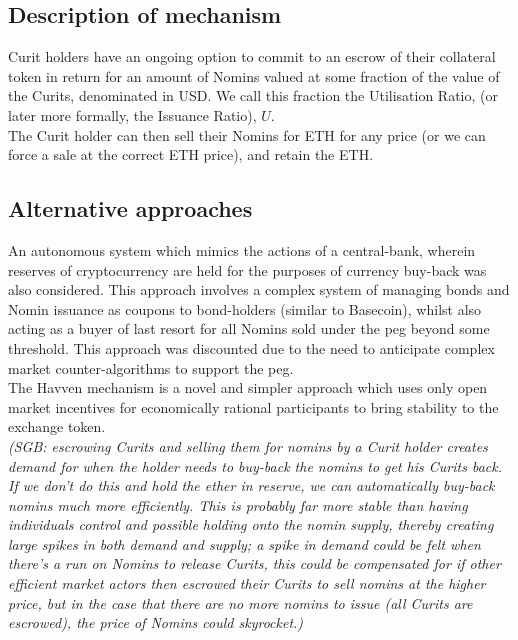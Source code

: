 \subsection{Description of mechanism}

Curit holders have an ongoing option to commit to an escrow of their collateral token in return for an amount of Nomins valued at some fraction of the value of the Curits, denominated in USD. We call this fraction the Utilisation Ratio, (or later more formally, the Issuance Ratio), $ U $. \\

\noindent The Curit holder can then sell their Nomins for ETH for any price (or we can force a sale at the correct ETH price), and retain the ETH.


\subsection{Alternative approaches}

\noindent An autonomous system which mimics the actions of a central-bank, wherein reserves of cryptocurrency are held for the purposes of currency buy-back was also considered. This approach involves a complex system of managing bonds and Nomin issuance as coupons to bond-holders (similar to Basecoin), whilst also acting as a buyer of last resort for all Nomins sold under the peg beyond some threshold. This approach was discounted due to the need to anticipate complex market counter-algorithms to support the peg. \\

\noindent The Havven mechanism is a novel and simpler approach which uses only open market incentives for economically rational participants to bring stability to the exchange token. \\

\textit{(SGB: escrowing Curits and selling them for nomins by a Curit holder creates demand for when the holder needs to buy-back the nomins to get his Curits back. If we don't do this and hold the ether in reserve, we can automatically buy-back nomins much more efficiently. This is probably far more stable than having individuals control and possible holding onto the nomin supply, thereby creating large spikes in both demand and supply; a spike in demand could be felt when there's a run on Nomins to release Curits, this could be compensated for if other efficient market actors then escrowed their Curits to sell nomins at the higher price, but in the case that there are no more nomins to issue (all Curits are escrowed), the price of Nomins could skyrocket.)}

